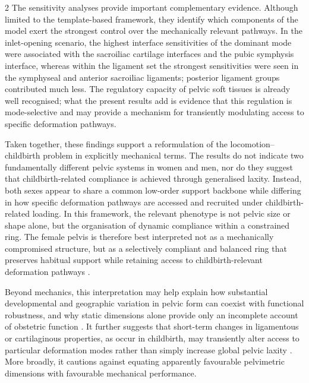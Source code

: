 \documentclass[openacc]{rsproca_new}
\begin{document}
\begin{multicols}{2}
The sensitivity analyses provide important complementary evidence. Although limited to the template-based framework, they identify which components of the model exert the strongest control over the mechanically relevant pathways. In the inlet-opening scenario, the highest interface sensitivities of the dominant mode were associated with the sacroiliac cartilage interfaces and the pubic symphysis interface, whereas within the ligament set the strongest sensitivities were seen in the symphyseal and anterior sacroiliac ligaments; posterior ligament groups contributed much less. The regulatory capacity of pelvic soft tissues is already well recognised; what the present results add is evidence that this regulation is mode-selective and may provide a mechanism for transiently modulating access to specific deformation pathways.

Taken together, these findings support a reformulation of the locomotion--childbirth problem in explicitly mechanical terms. The results do not indicate two fundamentally different pelvic systems in women and men, nor do they suggest that childbirth-related compliance is achieved through generalised laxity. Instead, both sexes appear to share a common low-order support backbone while differing in how specific deformation pathways are accessed and recruited under childbirth-related loading. In this framework, the relevant phenotype is not pelvic size or shape alone, but the organisation of dynamic compliance within a constrained ring. The female pelvis is therefore best interpreted not as a mechanically compromised structure, but as a selectively compliant and balanced ring that preserves habitual support while retaining access to childbirth-relevant deformation pathways \cite{Pavlicev2020,Haeusler2021,Grunstra2023,Warrener2015}.

Beyond mechanics, this interpretation may help explain how substantial developmental and geographic variation in pelvic form can coexist with functional robustness, and why static dimensions alone provide only an incomplete account of obstetric function \cite{BettiManica2018,Auerbach2018,VerbruggenNowlan2017,Novak2020,KurkiDecrausaz2015}. It further suggests that short-term changes in ligamentous or cartilaginous properties, as occur in childbirth, may transiently alter access to particular deformation modes rather than simply increase global pelvic laxity \cite{Vleeming2012,Kiapour2019,Stolarczyk2021}. More broadly, it cautions against equating apparently favourable pelvimetric dimensions with favourable mechanical performance.


\end{multicols}
\end{document}
